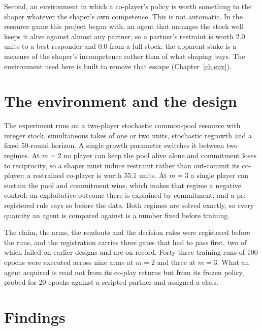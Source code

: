 Second, an environment in which a co-player's policy is worth something to
the shaper whatever the shaper's own competence.
This is not automatic.
In the resource game this project began with, an agent that manages the
stock well keeps it alive against almost any partner, so a partner's
restraint is worth 2.0 units to a best responder and 0.0 from a full stock:
the apparent stake is a measure of the shaper's incompetence rather than of
what shaping buys.
The environment used here is built to remove that escape (Chapter~\ref{ch:env}).

\section{The environment and the design}
\label{sec:aims-design}

The experiment runs on a two-player stochastic common-pool resource with
integer stock, simultaneous takes of one or two units, stochastic regrowth
and a fixed 50-round horizon.
A single growth parameter switches it between two regimes.
At \(m=2\) no player can keep the pool alive alone and commitment loses to
reciprocity, so a shaper must induce restraint rather than out-commit its
co-player; a restrained co-player is worth 55.1 units.
At \(m=3\) a single player can sustain the pool and commitment wins, which
makes that regime a negative control: an exploitative outcome there is
explained by commitment, and a pre-registered rule says so before the data.
Both regimes are solved exactly, so every quantity an agent is compared
against is a number fixed before training.

The claim, the arms, the readouts and the decision rules were registered
before the runs, and the registration carries three gates that had to pass
first, two of which failed on earlier designs and are on record.
Forty-three training runs of 100 epochs were executed across nine arms at
\(m=2\) and three at \(m=3\).
What an agent acquired is read not from its co-play returns but from its
frozen policy, probed for 20 epochs against a scripted partner and assigned
a class.

\section{Findings}
\label{sec:aims-findings}

